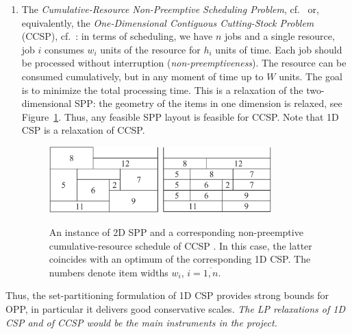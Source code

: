 \documentclass[a4paper,12pt]{article}
\begin{document}
\begin{enumerate}
\item The \emph{Cumulative-Resource Non-Preemptive Scheduling Problem}, cf.\ \cite{ClaConstr} or, equivalently, the \emph{One-Dimensional Contiguous Cutting-Stock Problem} (CCSP), cf.\ \cite{MMV03,SPPExactAlvarez}: in terms of scheduling, we have $n$ jobs and a single resource, job $i$ consumes $w_i$ units of the resource for $h_i$ units of time. Each job should be processed without interruption (\emph{non-preemptiveness}). The resource can be consumed cumulatively, but in any moment of time up to $W$ units. The goal is to minimize the total processing time. This is a relaxation of the two-dimensional SPP: the geometry of the items in one dimension is relaxed, see Figure~\ref{figCCSP}. Thus, any feasible SPP layout is feasible for CCSP. Note that 1D CSP is a relaxation of CCSP.
\begin{figure}[htb]

\qquad
\begin{minipage}{0.9\textwidth}
\centering

\includegraphics[width=0.4\textwidth]{ctg1_opp}
\hfill
\includegraphics[width=0.4\textwidth]{ctg1}

\caption{\label{figCCSP}An instance of 2D SPP and a corresponding non-preemptive cumulative-resource schedule of CCSP \cite{Sch08}. In this case, the latter coincides with an optimum of the corresponding 1D CSP. The numbers denote item widths $w_i$, $i=\overline{1,n}$.}
\end{minipage}
\end{figure}
\end{enumerate}
Thus, the set-partitioning formulation of 1D CSP provides strong bounds for OPP, in particular it delivers good conservative scales. \emph{The LP relaxations of 1D CSP and of CCSP would be the main instruments in the project.}
\end{document}
